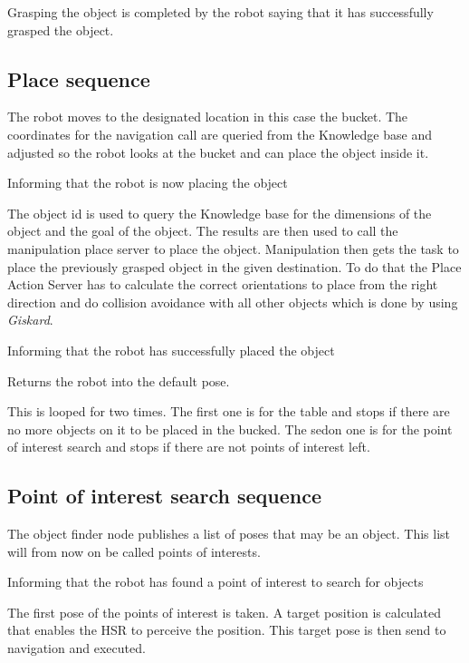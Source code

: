 \documentclass[main.tex]{subfiles}
\begin{document}
	\begin{nlp}
	Grasping the object is completed by the robot saying that it has successfully grasped the object.
	\end{nlp}
    
	\subsection{Place sequence}
	The robot moves to the designated location in this case the bucket.
	The coordinates for the navigation call are queried from the Knowledge base and adjusted so the robot looks at the bucket and can place the object inside it. 
	
	Informing that the robot is now placing the object

	The object id is used to query the Knowledge base for the dimensions of the object and the goal of the object. The results are then used to call the manipulation place server to place the object. Manipulation then gets the task to place the previously grasped object in the given destination. To do that the Place Action Server has to calculate the correct orientations to place from the right direction and do collision avoidance with all other objects which is done by using \textit{Giskard}.
	 
	Informing that the robot has successfully placed the object

	Returns the robot into the default pose.
	
	This is looped for two times.
	The first one is for the table and stops if there are no more objects on it to be placed in the bucked. The sedon one is for the point of interest search and stops if there are not points of interest left.
	
	\subsection{Point of interest search sequence}
	The object finder node publishes a list of poses that may be an object. This list will from now on be called points of interests.
	
    Informing that the robot has found a point of interest to search for objects
    
    The first pose of the points of interest is taken. A target position is calculated that enables the HSR to perceive the position. This target pose is then send to navigation and executed.
    
\end{document}
